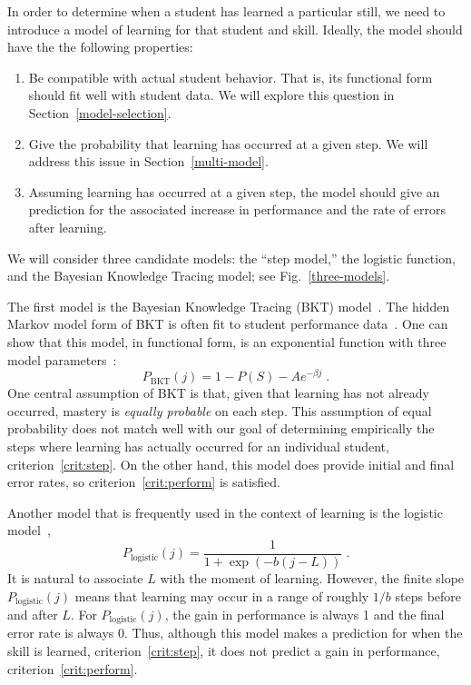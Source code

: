 \documentclass{acmlarge-edm}
\begin{document}
In order to determine when a student has learned a particular still,
we need to introduce a model of learning for that student and skill.
Ideally, the model should have the the following properties:
\label{model-criteria}
%
\begin{enumerate} 

\item Be compatible with actual student behavior.
      That is, its
      functional form should fit well with student data.
      We will explore this question in Section~\ref{model-selection}.  

\item \label{crit:step}
      Give the probability that learning has occurred at a given step.
      We will address this issue in Section~\ref{multi-model}.

\item  \label{crit:perform}
     Assuming learning has occurred at a given step, the model
     should give an prediction for the 
     associated increase in performance and 
     the rate of errors after learning.

\end{enumerate}
%
We will consider three candidate models:  the ``step model,'' 
the logistic function, and the Bayesian Knowledge Tracing model;
see Fig.~\ref{three-models}.


The first model is the Bayesian Knowledge Tracing (BKT) 
model~\cite{corbett_knowledge_1994}.  The hidden Markov model
form of BKT is often fit to student performance 
data~\cite{beck_identifiability:_2007}.  One can show that
this model, in functional form, is an exponential function
with three model parameters~\cite{van_de_sande_properties_2012}:
%
\begin{equation}
         P_\mathrm{BKT}(j) = 1-P(S) -A e^{-\beta j} \; .
\end{equation}
%
One central assumption of BKT is that, given that learning
has not already occurred, mastery is {\em equally probable} on each step.
This assumption of equal probability does not match well with 
our goal of determining empirically the steps where learning has 
actually occurred for an individual student, criterion~\ref{crit:step}.
On the other hand, this model does provide initial and final
error rates, so criterion~\ref{crit:perform} is satisfied. 

Another model that is frequently used in the context of learning is
the logistic
model~\cite{cen_learning_2006,chi_instructional_2011},
%
\begin{equation}
    P_\mathrm{logistic}(j)= \frac{1}{1+\exp\left(-b (j-L)\right)} \; .
\end{equation}
%
It is natural to associate $L$ with the moment of learning.  However,
the finite slope $P_\mathrm{logistic}(j)$ means that learning may
occur in a range of roughly $1/b$ steps before and after $L$.  For
$P_\mathrm{logistic}(j)$, the gain in performance is always 1 and the
final error rate is always 0.  Thus, although this model makes a
prediction for when the skill is learned, criterion~\ref{crit:step},
it does not predict a gain in performance,
criterion~\ref{crit:perform}.
\end{document}
